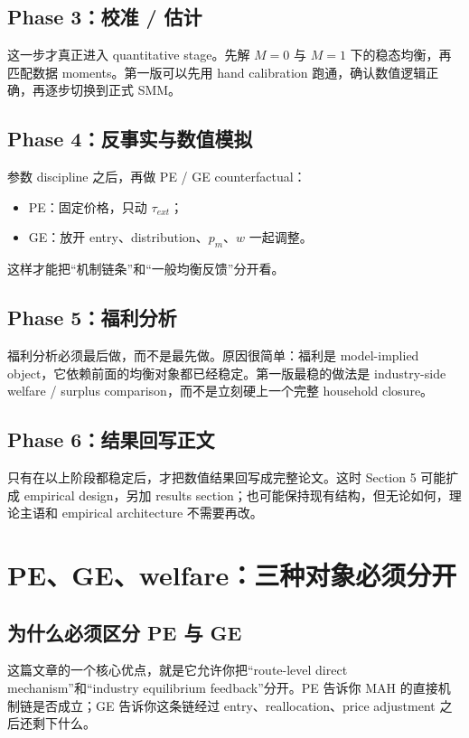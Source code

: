 \documentclass[12pt]{ctexart}
\newcommand{\tauext}{\tau_{ext}}
\begin{document}
\subsection{Phase 3：校准 / 估计}
这一步才真正进入 quantitative stage。先解 $M=0$ 与 $M=1$ 下的稳态均衡，再匹配数据 moments。第一版可以先用 hand calibration 跑通，确认数值逻辑正确，再逐步切换到正式 SMM。

\subsection{Phase 4：反事实与数值模拟}
参数 discipline 之后，再做 PE / GE counterfactual：
\begin{itemize}[leftmargin=2em]
    \item PE：固定价格，只动 $\tauext$；
    \item GE：放开 entry、distribution、$p_m$、$w$ 一起调整。
\end{itemize}
这样才能把“机制链条”和“一般均衡反馈”分开看。

\subsection{Phase 5：福利分析}
福利分析必须最后做，而不是最先做。原因很简单：福利是 model-implied object，它依赖前面的均衡对象都已经稳定。第一版最稳的做法是 industry-side welfare / surplus comparison，而不是立刻硬上一个完整 household closure。

\subsection{Phase 6：结果回写正文}
只有在以上阶段都稳定后，才把数值结果回写成完整论文。这时 Section 5 可能扩成 empirical design，另加 results section；也可能保持现有结构，但无论如何，理论主语和 empirical architecture 不需要再改。

\section{PE、GE、welfare：三种对象必须分开}

\subsection{为什么必须区分 PE 与 GE}
这篇文章的一个核心优点，就是它允许你把“route-level direct mechanism”和“industry equilibrium feedback”分开。PE 告诉你 MAH 的直接机制链是否成立；GE 告诉你这条链经过 entry、reallocation、price adjustment 之后还剩下什么。
\end{document}

